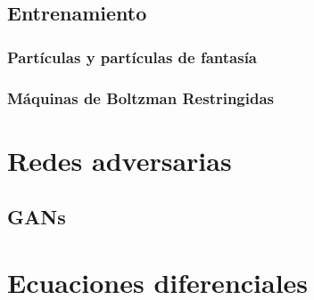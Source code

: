 \documentclass[12pt,openany]{book}
\begin{document}
\section{Entrenamiento}
\subsection{Partículas y partículas de fantasía}
\subsection{Máquinas de Boltzman Restringidas}

\chapter{Redes adversarias}
\section{GANs}

\appendix 
\chapter{Ecuaciones diferenciales}

\backmatter

\printbibliography[heading=bibintoc]
\end{document}
